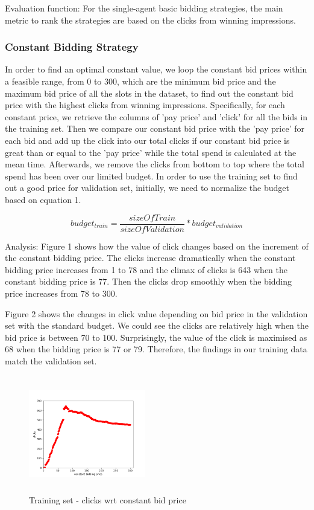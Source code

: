 \documentclass{sig-alternate-05-2015}
\begin{document}
Evaluation function: For the single-agent basic bidding strategies, the main metric to rank the strategies are based on the clicks from winning impressions.

\subsubsection{Constant Bidding Strategy}
In order to find an optimal constant value, we loop the constant bid prices within a feasible range, from 0 to 300, which are the minimum bid price and the maximum bid price of all the slots in the dataset, to find out the constant bid price with the highest clicks from winning impressions.
Specifically, for each constant price, we retrieve the columns of 'pay price' and 'click' for all the bids in the training set. Then we compare our constant bid price with the 'pay price' for each bid and add up the click into our total clicks if our constant bid price is great than or equal to the 'pay price' while the total spend is calculated at the mean time. Afterwards, we remove the clicks from bottom to top where the total spend has been over our limited budget.
In order to use the training set to find out a good price for validation set, initially, we need to normalize the budget based on equation 1.

\begin{equation}budget_{train}=\frac{sizeOfTrain}{sizeOfValidation} * budget_{validation}\end{equation}

Analysis:
Figure 1 shows how the value of click changes based on the increment of the constant bidding price. The clicks increase dramatically when the constant bidding price increases from 1 to 78 and the climax of clicks is 643 when the constant bidding price is 77. Then the clicks drop smoothly when the bidding price increases from 78 to 300.


Figure 2 shows the changes in click value depending on bid price in the validation set with the standard budget. We could see the clicks are relatively high when the bid price is between 70 to 100. Surprisingly, the value of the click is maximised as 68 when the bidding price is 77 or 79. Therefore, the findings in our training data match the validation set.

\begin{figure}
\centering
\includegraphics[height=2in, width=2in]{images/constant_bidding.png}
\caption{Training set - clicks wrt constant bid price}
\end{figure}
\end{document}
